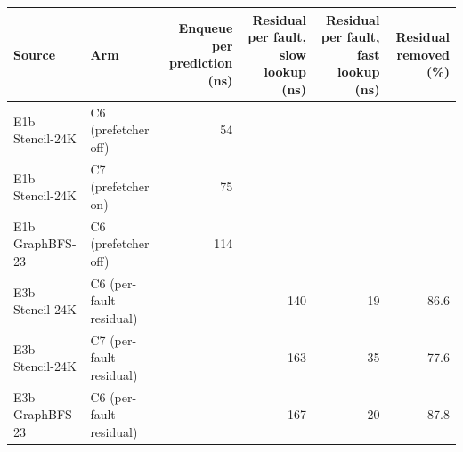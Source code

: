 \begin{tabular}{@{}llrrrr@{}}
\toprule
Source & Arm & Enqueue per prediction (ns) & Residual per fault, slow lookup (ns) & Residual per fault, fast lookup (ns) & Residual removed (\%) \\
\midrule
E1b Stencil-24K & C6 (prefetcher off) & 54 &  &  &  \\ %
E1b Stencil-24K & C7 (prefetcher on) & 75 &  &  &  \\ %
E1b GraphBFS-23 & C6 (prefetcher off) & 114 &  &  &  \\ %
\midrule
E3b Stencil-24K & C6 (per-fault residual) &  & 140 & 19 & 86.6 \\ %
E3b Stencil-24K & C7 (per-fault residual) &  & 163 & 35 & 77.6 \\ %
E3b GraphBFS-23 & C6 (per-fault residual) &  & 167 & 20 & 87.8 \\ %
\bottomrule
\end{tabular}
